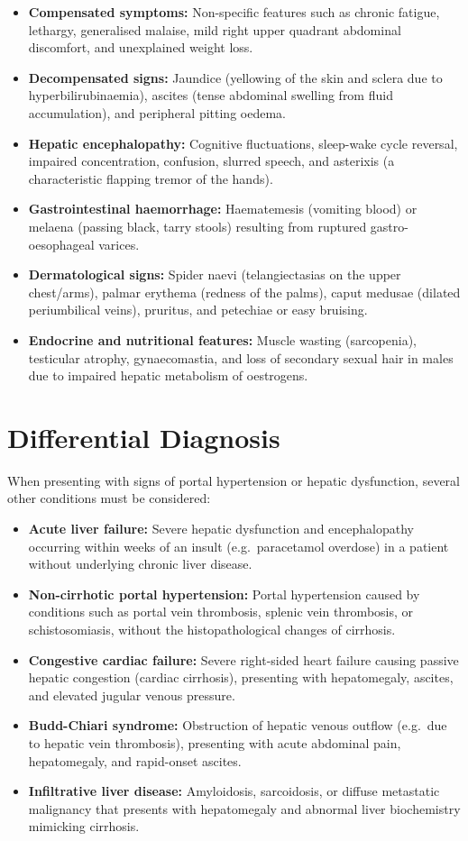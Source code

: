 \begin{itemize}
    \item \textbf{Compensated symptoms:} Non-specific features such as chronic fatigue, lethargy, generalised malaise, mild right upper quadrant abdominal discomfort, and unexplained weight loss.
    \item \textbf{Decompensated signs:} Jaundice (yellowing of the skin and sclera due to hyperbilirubinaemia), ascites (tense abdominal swelling from fluid accumulation), and peripheral pitting oedema.
    \item \textbf{Hepatic encephalopathy:} Cognitive fluctuations, sleep-wake cycle reversal, impaired concentration, confusion, slurred speech, and asterixis (a characteristic flapping tremor of the hands).
    \item \textbf{Gastrointestinal haemorrhage:} Haematemesis (vomiting blood) or melaena (passing black, tarry stools) resulting from ruptured gastro-oesophageal varices.
    \item \textbf{Dermatological signs:} Spider naevi (telangiectasias on the upper chest/arms), palmar erythema (redness of the palms), caput medusae (dilated periumbilical veins), pruritus, and petechiae or easy bruising.
    \item \textbf{Endocrine and nutritional features:} Muscle wasting (sarcopenia), testicular atrophy, gynaecomastia, and loss of secondary sexual hair in males due to impaired hepatic metabolism of oestrogens.
\end{itemize}

\section*{Differential Diagnosis}
When presenting with signs of portal hypertension or hepatic dysfunction, several other conditions must be considered:

\begin{itemize}
    \item \textbf{Acute liver failure:} Severe hepatic dysfunction and encephalopathy occurring within weeks of an insult (e.g.\ paracetamol overdose) in a patient without underlying chronic liver disease.
    \item \textbf{Non-cirrhotic portal hypertension:} Portal hypertension caused by conditions such as portal vein thrombosis, splenic vein thrombosis, or schistosomiasis, without the histopathological changes of cirrhosis.
    \item \textbf{Congestive cardiac failure:} Severe right-sided heart failure causing passive hepatic congestion (cardiac cirrhosis), presenting with hepatomegaly, ascites, and elevated jugular venous pressure.
    \item \textbf{Budd-Chiari syndrome:} Obstruction of hepatic venous outflow (e.g.\ due to hepatic vein thrombosis), presenting with acute abdominal pain, hepatomegaly, and rapid-onset ascites.
    \item \textbf{Infiltrative liver disease:} Amyloidosis, sarcoidosis, or diffuse metastatic malignancy that presents with hepatomegaly and abnormal liver biochemistry mimicking cirrhosis.
\end{itemize}

